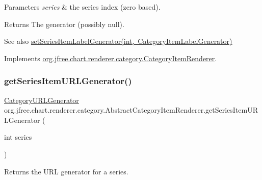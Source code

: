 \begin{DoxyParams}{Parameters}
{\em series} & the series index (zero based).\\
\hline
\end{DoxyParams}
\begin{DoxyReturn}{Returns}
The generator (possibly {\ttfamily null}).
\end{DoxyReturn}
\begin{DoxySeeAlso}{See also}
\mbox{\hyperlink{classorg_1_1jfree_1_1chart_1_1renderer_1_1category_1_1_abstract_category_item_renderer_a68950a45e273433edc3343a958860bf6}{set\+Series\+Item\+Label\+Generator(int, Category\+Item\+Label\+Generator)}} 
\end{DoxySeeAlso}


Implements \mbox{\hyperlink{interfaceorg_1_1jfree_1_1chart_1_1renderer_1_1category_1_1_category_item_renderer_a39fd0df143abb1baf56ba931552a3047}{org.\+jfree.\+chart.\+renderer.\+category.\+Category\+Item\+Renderer}}.

\mbox{\label{classorg_1_1jfree_1_1chart_1_1renderer_1_1category_1_1_abstract_category_item_renderer_a8281cfcc9d4be151f6ed682f16cca2a3}} 
\subsubsection{\texorpdfstring{get\+Series\+Item\+U\+R\+L\+Generator()}{getSeriesItemURLGenerator()}}
{\footnotesize\ttfamily \mbox{\hyperlink{interfaceorg_1_1jfree_1_1chart_1_1urls_1_1_category_u_r_l_generator}{Category\+U\+R\+L\+Generator}} org.\+jfree.\+chart.\+renderer.\+category.\+Abstract\+Category\+Item\+Renderer.\+get\+Series\+Item\+U\+R\+L\+Generator (\begin{DoxyParamCaption}\item[{int}]{series }\end{DoxyParamCaption})}

Returns the U\+RL generator for a series.



